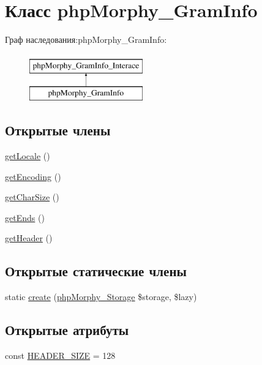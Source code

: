 \hypertarget{classphpMorphy__GramInfo}{
\section{Класс phpMorphy\_\-GramInfo}
\label{classphpMorphy__GramInfo}
}
Граф наследования:phpMorphy\_\-GramInfo:\begin{figure}[H]
\begin{center}
\leavevmode
\includegraphics[height=2.000000cm]{classphpMorphy__GramInfo}
\end{center}
\end{figure}
\subsection*{Открытые члены}
\begin{DoxyCompactItemize}
\item 
\hyperlink{classphpMorphy__GramInfo_a5ed0138e0901deb22a743ed133348dd9}{getLocale} ()
\item 
\hyperlink{classphpMorphy__GramInfo_af214a1e5bd49de1326694037bfc6f662}{getEncoding} ()
\item 
\hyperlink{classphpMorphy__GramInfo_a11c2baae365d841d088372344336b011}{getCharSize} ()
\item 
\hyperlink{classphpMorphy__GramInfo_acba19ce68975f7e91e75b0f349d19633}{getEnds} ()
\item 
\hyperlink{classphpMorphy__GramInfo_a1da46a97a6c7ef98d02cc012a7097bf1}{getHeader} ()
\end{DoxyCompactItemize}
\subsection*{Открытые статические члены}
\begin{DoxyCompactItemize}
\item 
static \hyperlink{classphpMorphy__GramInfo_aebfe385e82588fb1c9dd38e9a843c022}{create} (\hyperlink{classphpMorphy__Storage}{phpMorphy\_\-Storage} \$storage, \$lazy)
\end{DoxyCompactItemize}
\subsection*{Открытые атрибуты}
\begin{DoxyCompactItemize}
\item 
const \hyperlink{classphpMorphy__GramInfo_a54ad8d949af9a1dd05a1d79fbff10a66}{HEADER\_\-SIZE} = 128
\end{DoxyCompactItemize}
